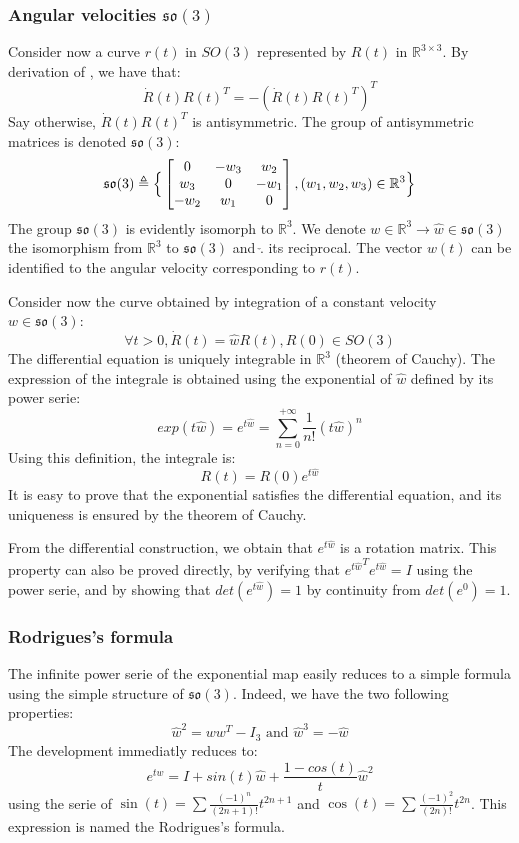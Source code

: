 \documentclass{book}
\begin{document}
\subsubsection{Angular velocities $\mathfrak{so}(3)$}

Consider now a curve $r(t)$ in $SO(3)$ represented by $R(t)$ in $\mathbb{R}^{3\times3}$. By derivation of , we have that:
\[ \dot{R}(t) R(t)^T = - ( \dot{R}(t) R(t)^T )^T \]
Say otherwise, $\dot{R}(t) R(t)^T$ is antisymmetric. The group of antisymmetric matrices is denoted $\mathfrak{so}(3)$:
\[ \mathfrak{so}(3) \triangleq \Big\{ \begin{bmatrix} 0 & -w_3  & w_2 \\ w_3 & 0 & -w_1 \\ -w_2 & w_1 & 0 \end{bmatrix}, (w_1,w_2,w_3) \in \mathbb{R}^3 \Big\} \]
The group $\mathfrak{so}(3)$ is evidently isomorph to $\mathbb{R}^3$. We denote $w \in \mathbb{R}^3 \rightarrow \hat{w} \in \mathfrak{so}(3)$ the isomorphism from $\mathbb{R}^3$ to $\mathfrak{so}(3)$ and $\check{.}$ its reciprocal. The vector $w(t)$ can be identified to the angular velocity corresponding to $r(t)$.

Consider now the curve obtained by integration of a constant velocity $w \in \mathfrak{so}(3)$:
\[ \forall t>0, \dot{R}(t) = \hat{w} R(t), R(0) \in SO(3) \]
The differential equation is uniquely integrable in $\mathbb{R}^3$ (theorem of Cauchy). The expression of the integrale is obtained using the exponential of $\hat{w}$ defined by its power serie:
\[ exp( t \hat w  ) = e^{t \hat w} = \sum_{n=0}^{+\infty} \frac{1}{n!} (t \hat w)^n \]
Using this definition, the integrale is:
\[ R(t) = R(0) e^{t \hat w} \]
It is easy to prove that the exponential satisfies the differential equation, and its uniqueness is ensured by the theorem of Cauchy.

From the differential construction, we obtain that $e^{t \hat w}$ is a rotation matrix. This property can also be proved directly, by verifying that ${e^{t \hat w}}^T e^{t \hat w} = I$ using the power serie, and by showing that $det(e^{t \hat w})=1$ by continuity from $det(e^0)=1$.

\subsubsection{Rodrigues's formula}

The infinite power serie of the exponential map easily reduces to a simple formula using the simple structure of $\mathfrak{so}(3)$. Indeed, we have the two following properties:
\[ \hat{w}^2 = ww^T - I_3 \textrm{ and } \hat{w}^3 = -\hat{w} \]
The development immediatly reduces to:
\[ e^{t \hat w} = I + sin(t) \hat{w} + \frac{1-cos(t)}{t} \hat{w}^2 \]
using the serie of $\sin(t) = \sum \frac{(-1)^{n}}{(2n+1)!} t^{2n+1} $ and $\cos(t) = \sum \frac{(-1)^2}{(2n)!} t^{2n}$.
This expression is named the Rodrigues's formula.
\end{document}

